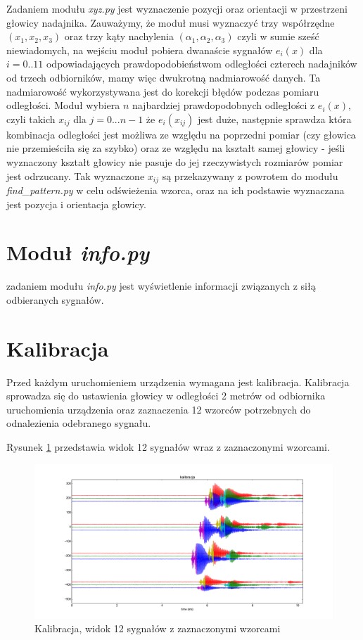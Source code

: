 Zadaniem modułu \textit{xyz.py} jest wyznaczenie pozycji oraz orientacji w przestrzeni głowicy nadajnika.
Zauważymy, że moduł musi wyznaczyć trzy współrzędne $(x_1,x_2,x_3)$
oraz trzy kąty nachylenia $(\alpha_1, \alpha_2, \alpha_3)$ czyli w sumie sześć niewiadomych,
na wejściu moduł pobiera dwanaście sygnałów $e_i(x)$ dla $i=0..11$ odpowiadających prawdopodobieństwom odległości
czterech nadajników od trzech odbiorników, mamy więc dwukrotną nadmiarowość danych.
Ta nadmiarowość wykorzystywana jest do korekcji błędów podczas pomiaru odległości.
Moduł wybiera $n$ najbardziej prawdopodobnych odległości z $e_i(x)$, czyli takich $x_{ij}$ dla $j = 0...n-1$
że $e_i(x_{ij})$ jest duże, następnie sprawdza która kombinacja 
odległości jest możliwa ze względu na poprzedni pomiar (czy głowica nie przemieściła się za szybko)
oraz ze względu na kształt samej głowicy - jeśli wyznaczony kształt głowicy nie pasuje do jej rzeczywistych
rozmiarów pomiar jest odrzucany.
Tak wyznaczone $x_{ij}$ są przekazywany z powrotem do modułu \textit{find\_pattern.py} w celu odświeżenia wzorca,
oraz na ich podstawie wyznaczana jest pozycja i orientacja głowicy.

\section{Moduł \textit{info.py}}

zadaniem modułu \textit{info.py} jest wyświetlenie informacji związanych z siłą odbieranych sygnałów.

\section{Kalibracja}

Przed każdym uruchomieniem urządzenia wymagana jest kalibracja.
Kalibracja sprowadza się do ustawienia głowicy w odległości 2 metrów od odbiornika
uruchomienia urządzenia oraz zaznaczenia 12 wzorców potrzebnych do odnalezienia 
odebranego sygnału.

Rysunek \ref{fig:kalibracja_12x} przedstawia widok 12 sygnałów wraz z zaznaczonymi wzorcami.


 \begin{figure}[h!]
    \centering
    \includegraphics[width=1.12\textwidth, trim= 46mm 0mm 0mm 0mm,clip]{kalibracja_12x}
    \caption{Kalibracja, widok 12 sygnałów z zaznaczonymi wzorcami}
    \label{fig:kalibracja_12x}
\end{figure}

